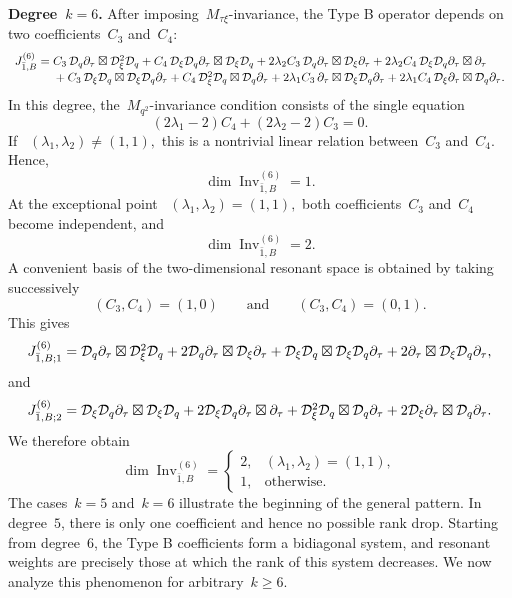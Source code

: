 \documentclass[12pt,a4paper]{amsart}
\theoremstyle{thm}
\theoremstyle{definition}
\newcommand {\Dq}{\cD_q}
\newcommand {\Dxi}{\cD_\xi}
\begin{document}
{\bf Degree~\(k=6\).} After imposing~\(M_{\tau\xi}\)-invariance, the Type B
operator depends on two coefficients~\(C_3\) and~\(C_4\):
\[
\begin{array}{r@{}l}
J_{\bar1,B}^{(6)}
={}&
C_3\,\Dq\partial_\tau\boxtimes \Dxi^2\Dq
+
C_4\,\Dxi\Dq\partial_\tau\boxtimes \Dxi\Dq
+
2\lambda_2C_3\,\Dq\partial_\tau\boxtimes \Dxi\partial_\tau
+
2\lambda_2C_4\,\Dxi\Dq\partial_\tau\boxtimes \partial_\tau
\\
&{}+
C_3\,\Dxi\Dq\boxtimes \Dxi\Dq\partial_\tau
+
C_4\,\Dxi^2\Dq\boxtimes \Dq\partial_\tau
+
2\lambda_1C_3\,\partial_\tau\boxtimes \Dxi\Dq\partial_\tau
+
2\lambda_1C_4\,\Dxi\partial_\tau\boxtimes \Dq\partial_\tau.
\end{array}
\]
In this degree, the~\(M_{q^2}\)-invariance condition consists of the
single equation
\[
(2\lambda_1-2)C_4
+
(2\lambda_2-2)C_3
=
0.
\]
If~%
$
(\lambda_1,\lambda_2)\neq(1,1),
$
this is a nontrivial linear relation between~\(C_3\) and~\(C_4\).
Hence,
\[
\dim\operatorname{Inv}_{\bar1,B}^{(6)}=1.
\]
At the exceptional point~%
$
(\lambda_1,\lambda_2)=(1,1),
$
both coefficients~\(C_3\) and~\(C_4\) become independent, and
\[
\dim\operatorname{Inv}_{\bar1,B}^{(6)}=2.
\]
A convenient basis of the two-dimensional resonant space is obtained
by taking successively
\[
(C_3,C_4)=(1,0)
\qquad\text{and}\qquad
(C_3,C_4)=(0,1).
\]
This gives
\[
\begin{array}{r@{}l}
J_{\bar1,B;1}^{(6)}
={}&
\Dq\partial_\tau\boxtimes \Dxi^2\Dq
+
2\Dq\partial_\tau\boxtimes \Dxi\partial_\tau
+
\Dxi\Dq\boxtimes \Dxi\Dq\partial_\tau
+
2\partial_\tau\boxtimes \Dxi\Dq\partial_\tau,
\end{array}
\]
and
\[
\begin{array}{r@{}l}
J_{\bar1,B;2}^{(6)}
={}&
\Dxi\Dq\partial_\tau\boxtimes \Dxi\Dq
+
2\Dxi\Dq\partial_\tau\boxtimes \partial_\tau
+
\Dxi^2\Dq\boxtimes \Dq\partial_\tau
+
2\Dxi\partial_\tau\boxtimes \Dq\partial_\tau.
\end{array}
\]
We therefore obtain
\[
\dim\operatorname{Inv}_{\bar1,B}^{(6)}
=
\begin{cases}
2,
&
(\lambda_1,\lambda_2)=(1,1),
\\[1mm]
1,
&
\text{otherwise}.
\end{cases}
\]
The cases~\(k=5\) and~\(k=6\) illustrate the beginning of the general
pattern. In degree~\(5\), there is only one coefficient and hence no
possible rank drop. Starting from degree~\(6\), the Type B coefficients
form a bidiagonal system, and resonant weights are precisely those at
which the rank of this system decreases. We now analyze this
phenomenon for arbitrary~\(k\geq6\).
\end{document}
